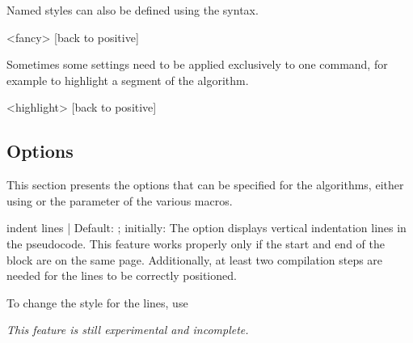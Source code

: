 \documentclass[a4paper, 11pt]{article}
\begin{document}
Named styles can also be defined using the  syntax.

\begin{PDExample}
    \begin{algorithmic}
        <fancy>
            [back to positive]
        \EndIf
    \end{algorithmic}
\end{PDExample}

Sometimes some settings need to be applied exclusively to one command, for example to highlight a segment of the algorithm.

\begin{PDExample}
    \begin{algorithmic}
            <highlight>
            [back to positive]
        \EndIf
    \end{algorithmic}
\end{PDExample}

\subsection{Options}\label{sec:options}
%
This section presents the options that can be specified for the algorithms, either using  or the  parameter of the various macros.

\begin{Optiondef}{indent lines}{ | }{Default: ; initially: }
    The  option displays vertical indentation lines in the pseudocode. This feature works properly only if the start and end of the block are on the same page. Additionally, at least two compilation steps are needed for the lines to be correctly positioned.

    To change the style for the lines, use 

    \textit{This feature is still experimental and incomplete.}
\end{Optiondef}
\end{document}
